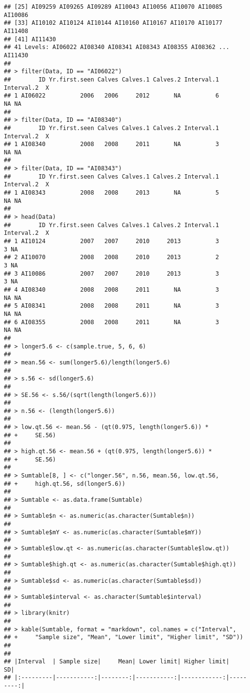\documentclass[]{book}
\begin{document}
\begin{verbatim}
## [25] AI09259 AI09265 AI09289 AI10043 AI10056 AI10070 AI10085 AI10086
## [33] AI10102 AI10124 AI10144 AI10160 AI10167 AI10170 AI10177 AI11408
## [41] AI11430
## 41 Levels: AI06022 AI08340 AI08341 AI08343 AI08355 AI08362 ... AI11430
## 
## > filter(Data, ID == "AI06022")
##        ID Yr.first.seen Calves Calves.1 Calves.2 Interval.1 Interval.2  X
## 1 AI06022          2006   2006     2012       NA          6         NA NA
## 
## > filter(Data, ID == "AI08340")
##        ID Yr.first.seen Calves Calves.1 Calves.2 Interval.1 Interval.2  X
## 1 AI08340          2008   2008     2011       NA          3         NA NA
## 
## > filter(Data, ID == "AI08343")
##        ID Yr.first.seen Calves Calves.1 Calves.2 Interval.1 Interval.2  X
## 1 AI08343          2008   2008     2013       NA          5         NA NA
## 
## > head(Data)
##        ID Yr.first.seen Calves Calves.1 Calves.2 Interval.1 Interval.2  X
## 1 AI10124          2007   2007     2010     2013          3          3 NA
## 2 AI10070          2008   2008     2010     2013          2          3 NA
## 3 AI10086          2007   2007     2010     2013          3          3 NA
## 4 AI08340          2008   2008     2011       NA          3         NA NA
## 5 AI08341          2008   2008     2011       NA          3         NA NA
## 6 AI08355          2008   2008     2011       NA          3         NA NA
## 
## > longer5.6 <- c(sample.true, 5, 6, 6)
## 
## > mean.56 <- sum(longer5.6)/length(longer5.6)
## 
## > s.56 <- sd(longer5.6)
## 
## > SE.56 <- s.56/(sqrt(length(longer5.6)))
## 
## > n.56 <- (length(longer5.6))
## 
## > low.qt.56 <- mean.56 - (qt(0.975, length(longer5.6)) * 
## +     SE.56)
## 
## > high.qt.56 <- mean.56 + (qt(0.975, length(longer5.6)) * 
## +     SE.56)
## 
## > Sumtable[8, ] <- c("longer.56", n.56, mean.56, low.qt.56, 
## +     high.qt.56, sd(longer5.6))
## 
## > Sumtable <- as.data.frame(Sumtable)
## 
## > Sumtable$n <- as.numeric(as.character(Sumtable$n))
## 
## > Sumtable$mY <- as.numeric(as.character(Sumtable$mY))
## 
## > Sumtable$low.qt <- as.numeric(as.character(Sumtable$low.qt))
## 
## > Sumtable$high.qt <- as.numeric(as.character(Sumtable$high.qt))
## 
## > Sumtable$sd <- as.numeric(as.character(Sumtable$sd))
## 
## > Sumtable$interval <- as.character(Sumtable$interval)
## 
## > library(knitr)
## 
## > kable(Sumtable, format = "markdown", col.names = c("Interval", 
## +     "Sample size", "Mean", "Lower limit", "Higher limit", "SD"))
## 
## 
## |Interval  | Sample size|     Mean| Lower limit| Higher limit|        SD|
## |:---------|-----------:|--------:|-----------:|------------:|---------:|

\end{verbatim}
\end{document}

